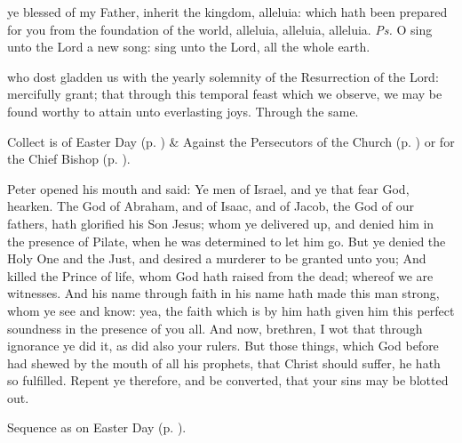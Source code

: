 \properantiphonfix

\introit
{} ye blessed of my Father, inherit the kingdom, alleluia: which hath been prepared for you from the foundation of the world, alleluia, alleluia, alleluia. \textit{Ps.} O sing unto the Lord a new song: sing unto the Lord, all the whole earth.

\collect
{} who dost gladden us with the yearly solemnity of the Resurrection of the Lord: mercifully grant; that through this temporal feast which we observe, we may be found worthy to attain unto everlasting joys. Through the same.
\begin{rubric}
     Collect is of Easter Day (p. \pageref{EasterCollect}) \&  Against the Persecutors of the Church (p. \pageref{SPAgainst}) or for the Chief Bishop (p. \pageref{SPChiefBishop}).
\end{rubric}

 Peter opened his mouth and said: Ye men of Israel, and ye that fear God, hearken. The God of Abraham, and of Isaac, and of Jacob, the God of our fathers, hath glorified his Son Jesus; whom ye delivered up, and denied him in the presence of Pilate, when he was determined to let him go. But ye denied the Holy One and the Just, and desired a murderer to be granted unto you; And killed the Prince of life, whom God hath raised from the dead; whereof we are witnesses. And his name through faith in his name hath made this man strong, whom ye see and know: yea, the faith which is by him hath given him this perfect soundness in the presence of you all. And now, brethren, I wot that through ignorance ye did it, as did also your rulers. But those things, which God before had shewed by the mouth of all his prophets, that Christ should suffer, he hath so fulfilled. Repent ye therefore, and be converted, that your sins may be blotted out.


\begin{rubric}
    Sequence as on Easter Day (p. \pageref{PaschalSequence}).
\end{rubric}

